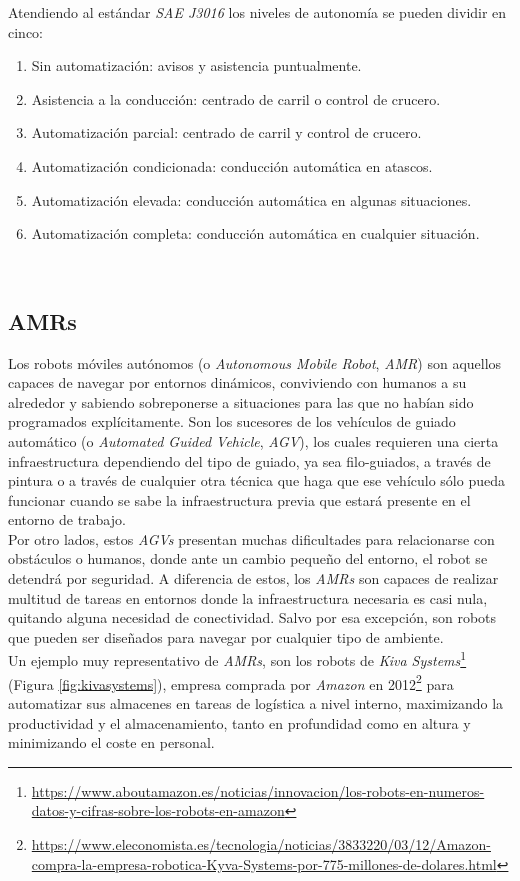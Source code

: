 Atendiendo al estándar \textit{SAE J3016} \cite{saej3016} los niveles de autonomía se pueden dividir en cinco:
\begin{enumerate}
	\item Sin automatización: avisos y asistencia puntualmente.
	\item Asistencia a la conducción: centrado de carril o control de crucero.
	\item Automatización parcial: centrado de carril y control de crucero.
	\item Automatización condicionada: conducción automática en atascos.
	\item Automatización elevada: conducción automática en algunas situaciones.
	\item Automatización completa: conducción automática en cualquier situación.
\end{enumerate}\

\subsection{AMRs}
\label{sec:amr}
Los robots móviles autónomos (o \textit{Autonomous Mobile Robot}, \textit{AMR}) son aquellos capaces de navegar por entornos dinámicos, conviviendo con humanos a su alrededor y sabiendo sobreponerse a situaciones para las que no habían sido programados explícitamente. Son los sucesores de los vehículos de guiado automático (o \textit{Automated Guided Vehicle}, \textit{AGV}), los cuales requieren una cierta infraestructura dependiendo del tipo de guiado, ya sea filo-guiados, a través de pintura o a través de cualquier otra técnica que haga que ese vehículo sólo pueda funcionar cuando se sabe la infraestructura previa que estará presente en el entorno de trabajo.\\

Por otro lados, estos \textit{AGVs} presentan muchas dificultades para relacionarse con obstáculos o humanos, donde ante un cambio pequeño del entorno, el robot se detendrá por seguridad. A diferencia de estos, los \textit{AMRs} son capaces de realizar multitud de tareas en entornos donde la infraestructura necesaria es casi nula, quitando alguna necesidad de conectividad. Salvo por esa excepción, son robots que pueden ser diseñados para navegar por cualquier tipo de ambiente.\\

Un ejemplo muy representativo de \textit{AMRs}, son los robots de \textit{Kiva Systems}\footnote{\url{https://www.aboutamazon.es/noticias/innovacion/los-robots-en-numeros-datos-y-cifras-sobre-los-robots-en-amazon}} (Figura \ref{fig:kivasystems}), empresa comprada por \textit{Amazon} en 2012\footnote{\url{https://www.eleconomista.es/tecnologia/noticias/3833220/03/12/Amazon-compra-la-empresa-robotica-Kyva-Systems-por-775-millones-de-dolares.html}} para automatizar sus almacenes en tareas de logística a nivel interno, maximizando la productividad y el almacenamiento, tanto en profundidad como en altura y minimizando el coste en personal.\\

